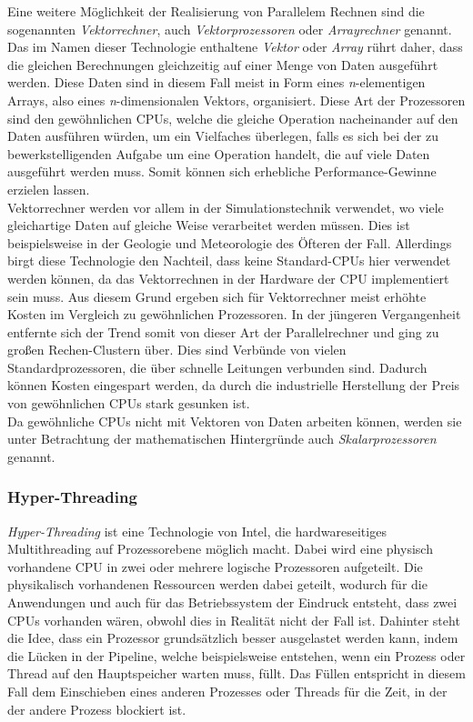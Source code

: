 				Eine weitere Möglichkeit der Realisierung von Parallelem Rechnen sind die sogenannten \textit{Vektorrechner}, auch \textit{Vektorprozessoren} oder \textit{Arrayrechner} genannt.\\
				Das im Namen dieser Technologie enthaltene \textit{Vektor} oder \textit{Array} rührt daher, dass die gleichen Berechnungen gleichzeitig auf einer Menge von Daten ausgeführt werden. Diese Daten sind in diesem Fall meist in Form eines \textit{n}-elementigen Arrays, also eines \textit{n}-dimensionalen Vektors, organisiert.
				Diese Art der Prozessoren sind den gewöhnlichen CPUs, welche die gleiche Operation nacheinander auf den Daten ausführen würden, um ein Vielfaches überlegen, falls es sich bei der zu bewerkstelligenden Aufgabe um eine Operation handelt, die auf viele Daten ausgeführt werden muss. Somit können sich erhebliche Performance-Gewinne erzielen lassen.\\
				Vektorrechner werden vor allem in der Simulationstechnik verwendet, wo viele gleichartige Daten auf gleiche Weise verarbeitet werden müssen. Dies ist beispielsweise in der Geologie und Meteorologie des Öfteren der Fall.
				Allerdings birgt diese Technologie den Nachteil, dass keine Standard-CPUs hier verwendet werden können, da das Vektorrechnen in der Hardware der CPU implementiert sein muss. Aus diesem Grund ergeben sich für Vektorrechner meist erhöhte Kosten im Vergleich zu gewöhnlichen Prozessoren. In der jüngeren Vergangenheit entfernte sich der Trend somit von dieser Art der Parallelrechner und ging zu großen Rechen-Clustern über. Dies sind Verbünde von vielen Standardprozessoren, die über schnelle Leitungen verbunden sind. Dadurch können Kosten eingespart werden, da durch die industrielle Herstellung der Preis von gewöhnlichen CPUs stark gesunken ist.\\
				Da gewöhnliche CPUs nicht mit Vektoren von Daten arbeiten können, werden sie unter Betrachtung der mathematischen Hintergründe auch \textit{Skalarprozessoren} genannt. \cite{VektorrechnerWikipedia}
			
			\subsubsection{Hyper-Threading}
			
				\textit{Hyper-Threading} ist eine Technologie von Intel, die hardwareseitiges Multithreading auf Prozessorebene möglich macht. Dabei wird eine physisch vorhandene CPU in zwei oder mehrere logische Prozessoren aufgeteilt. Die physikalisch vorhandenen Ressourcen werden dabei geteilt, wodurch für die Anwendungen und auch für das Betriebssystem der Eindruck entsteht, dass zwei CPUs vorhanden wären, obwohl dies in Realität nicht der Fall ist. Dahinter steht die Idee, dass ein Prozessor grundsätzlich besser ausgelastet werden kann, indem die Lücken in der Pipeline, welche beispielsweise entstehen, wenn ein Prozess oder Thread auf den Hauptspeicher warten muss, füllt. Das Füllen entspricht in diesem Fall dem Einschieben eines anderen Prozesses oder Threads für die Zeit, in der der andere Prozess blockiert ist. \cite{HyperThreadingIntel} \cite{HyperThreadingWikipedia}

